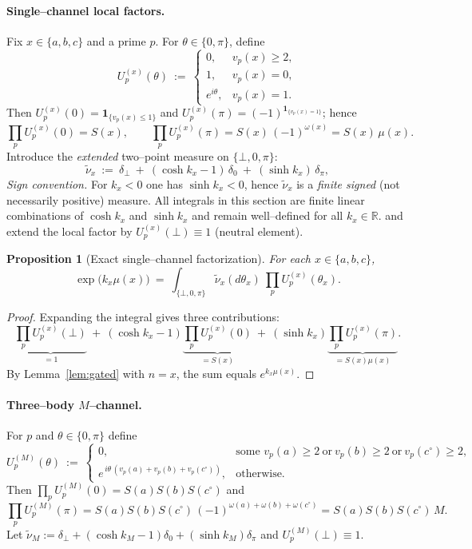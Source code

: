 \documentclass[12pt]{article}
\newtheorem{proposition}[theorem]{Proposition}
\numberwithin{equation}{section}
\begin{document}
\paragraph{Single–channel local factors.}
Fix $x\in\{a,b,c\}$ and a prime $p$. For $\theta\in\{0,\pi\}$, define
\[
U^{(x)}_p(\theta)\ :=\
\begin{cases}
0,& v_p(x)\ge 2,\\
1,& v_p(x)=0,\\
e^{i\theta},& v_p(x)=1.
\end{cases}
\]
Then $U^{(x)}_p(0)=\mathbf{1}_{\{v_p(x)\le 1\}}$ and $U^{(x)}_p(\pi)=(-1)^{\mathbf{1}_{\{v_p(x)=1\}}}$; hence
\[
\prod_p U^{(x)}_p(0)=S(x),\qquad
\prod_p U^{(x)}_p(\pi)=S(x)\,(-1)^{\omega(x)}=S(x)\,\mu(x).
\]
Introduce the \emph{extended} two–point measure on $\{\bot,0,\pi\}$:
\[
\tilde\nu_x\ :=\ \delta_{\bot}\ +\ (\cosh k_x - 1)\,\delta_{0}\ +\ (\sinh k_x)\,\delta_{\pi},
\]
\noindent\emph{Sign convention.} For $k_x<0$ one has $\sinh k_x<0$, hence $\tilde\nu_x$ is a \emph{finite signed} (not necessarily positive) measure. All integrals in this section are finite linear combinations of $\cosh k_x$ and $\sinh k_x$ and remain well–defined for all $k_x\in\mathbb{R}$.
and extend the local factor by $U^{(x)}_p(\bot)\equiv 1$ (neutral element).

\begin{proposition}[Exact single–channel factorization]\label{prop:single}
For each $x\in\{a,b,c\}$,
\[
\exp\!\big(k_x\mu(x)\big)\ =\ \int_{\{\bot,0,\pi\}}\tilde\nu_x(d\theta_x)\ \prod_{p} U^{(x)}_p(\theta_x).
\]
\end{proposition}

\begin{proof}
Expanding the integral gives three contributions:
\[
\underbrace{\prod_p U^{(x)}_p(\bot)}_{=1}\ +\ (\cosh k_x-1)\underbrace{\prod_p U^{(x)}_p(0)}_{=S(x)}\ +\ (\sinh k_x)\underbrace{\prod_p U^{(x)}_p(\pi)}_{=S(x)\mu(x)}.
\]
By Lemma~\ref{lem:gated} with $n=x$, the sum equals $e^{k_x\mu(x)}$.
\end{proof}

\paragraph{Three–body $M$–channel.}
For $p$ and $\theta\in\{0,\pi\}$ define
\[
U^{(M)}_p(\theta)\ :=\
\begin{cases}
0,& \text{some }v_p(a)\ge 2\ \text{or}\ v_p(b)\ge 2\ \text{or}\ v_p(c^\circ)\ge 2,\\
e^{\,i\theta\,(v_p(a)+v_p(b)+v_p(c^\circ))},& \text{otherwise.}
\end{cases}
\]
Then $\prod_p U^{(M)}_p(0)=S(a)S(b)S(c^\circ)$ and
\[
\prod_p U^{(M)}_p(\pi)
= S(a)S(b)S(c^\circ)\,(-1)^{\omega(a)+\omega(b)+\omega(c^\circ)}
= S(a)S(b)S(c^\circ)\,M.
\]
Let $\tilde\nu_M:=\delta_{\bot}+(\cosh k_M-1)\delta_{0}+(\sinh k_M)\delta_{\pi}$ and $U^{(M)}_p(\bot)\equiv 1$.
\end{document}
